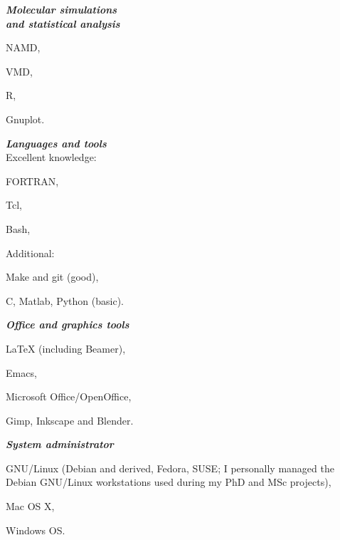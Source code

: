 \documentclass[a4paper,10pt,final]{memoir}
\newcommand{\SmallSep}{\vspace{0.4em}}
\newcommand{\CVItem}[2]
	{\textit{\textbf{\color{RoyalBlue} #1}} #2}
\begin{document}
\begin{multicols}{3}
\CVItem{Molecular simulations\\ and statistical analysis}
\begin{compactitem}[\color{RoyalBlue}$\circ$]
\item NAMD,
\item VMD,
\item R,
\item Gnuplot.
\end{compactitem}
\SmallSep 
\CVItem{Languages and 
  tools}\\
Excellent knowledge:
\begin{compactitem}[\color{RoyalBlue}$\circ$]
\item FORTRAN,
\item Tcl,
\item Bash,
\end{compactitem}
Additional:
\begin{compactitem}[\color{RoyalBlue}$\circ$]
\item Make and git (good),
\item C, Matlab, Python (basic).
\end{compactitem}
\SmallSep
\CVItem{Office and graphics tools} 
\begin{compactitem}[\color{RoyalBlue}$\circ$]
\item \LaTeX{} (including Beamer),
\item Emacs,
\item Microsoft Office/OpenOffice, 
\item Gimp, Inkscape and Blender.
\end{compactitem}
\SmallSep

\CVItem{System administrator}
\begin{compactitem}[\color{RoyalBlue}$\circ$]
\item GNU/Linux (Debian and derived, Fedora, SUSE; I personally managed the Debian
  GNU/Linux workstations used during my PhD and MSc projects),
\item Mac OS X,
\item Windows OS.
\end{compactitem}
\end{multicols}

\end{document}
